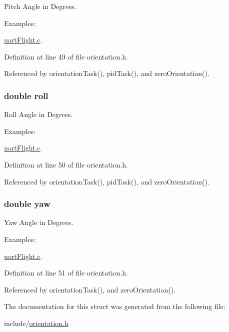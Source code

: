 Pitch Angle in Degrees. 

\begin{Desc}
\item[Examples\-: ]\par
\hyperlink{uart_flight_8c-example}{uart\-Flight.\-c}.\end{Desc}


Definition at line 49 of file orientation.\-h.



Referenced by orientation\-Task(), pid\-Task(), and zero\-Orientation().

\hypertarget{struct_angles_a1d3228afa3a1d6773954f40c1e519eb9}{
\subsubsection[{roll}]{\setlength{\rightskip}{0pt plus 5cm}double roll}}\label{struct_angles_a1d3228afa3a1d6773954f40c1e519eb9}


Roll Angle in Degrees. 

\begin{Desc}
\item[Examples\-: ]\par
\hyperlink{uart_flight_8c-example}{uart\-Flight.\-c}.\end{Desc}


Definition at line 50 of file orientation.\-h.



Referenced by orientation\-Task(), pid\-Task(), and zero\-Orientation().

\hypertarget{struct_angles_a21cd490f6191f66678f55b4c242a10cf}{
\subsubsection[{yaw}]{\setlength{\rightskip}{0pt plus 5cm}double yaw}}\label{struct_angles_a21cd490f6191f66678f55b4c242a10cf}


Yaw Angle in Degrees. 

\begin{Desc}
\item[Examples\-: ]\par
\hyperlink{uart_flight_8c-example}{uart\-Flight.\-c}.\end{Desc}


Definition at line 51 of file orientation.\-h.



Referenced by orientation\-Task(), and zero\-Orientation().



The documentation for this struct was generated from the following file\-:\begin{DoxyCompactItemize}
\item 
include/\hyperlink{orientation_8h}{orientation.\-h}\end{DoxyCompactItemize}
